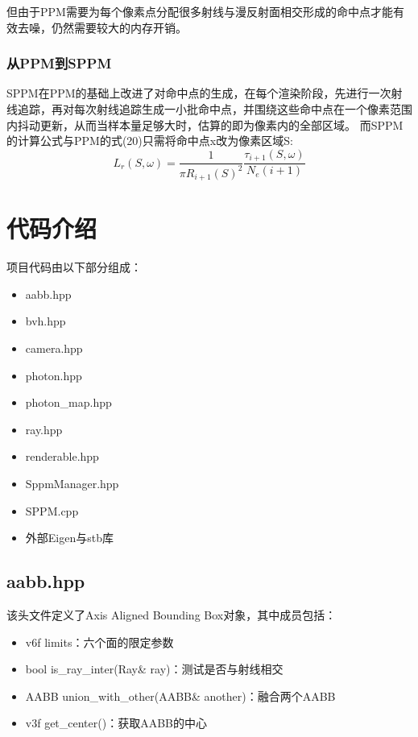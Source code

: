 \documentclass[12pt]{article}
\begin{document}
但由于PPM需要为每个像素点分配很多射线与漫反射面相交形成的命中点才能有效去噪，仍然需要较大的内存开销。
\subsubsection{从PPM到SPPM}
SPPM在PPM的基础上改进了对命中点的生成，在每个渲染阶段，先进行一次射线追踪，再对每次射线追踪生成一小批命中点，并围绕这些命中点在一个像素范围内抖动更新，从而当样本量足够大时，估算的即为像素内的全部区域。
而SPPM的计算公式与PPM的式(20)只需将命中点x改为像素区域S:
\begin{equation}
    L_r(S,\omega)=\frac{1}{\pi R_{i+1}(S)^2}\frac{\tau_{i+1}(S,\omega)}{N_e(i+1)}
\end{equation}

\section{代码介绍}

项目代码由以下部分组成：
\begin{itemize}
    \item aabb.hpp
    \item bvh.hpp
    \item camera.hpp
    \item photon.hpp
    \item photon\_map.hpp
    \item ray.hpp
    \item renderable.hpp
    \item SppmManager.hpp
    \item SPPM.cpp
    \item 外部Eigen与stb库
\end{itemize}

\subsection{aabb.hpp}
该头文件定义了Axis Aligned Bounding Box对象，其中成员包括：
\begin{itemize}
    \item v6f limits：六个面的限定参数
    \item bool is\_ray\_inter(Ray\& ray)：测试是否与射线相交
    \item AABB union\_with\_other(AABB\& another)：融合两个AABB
    \item v3f get\_center()：获取AABB的中心
\end{itemize}
\end{document}
